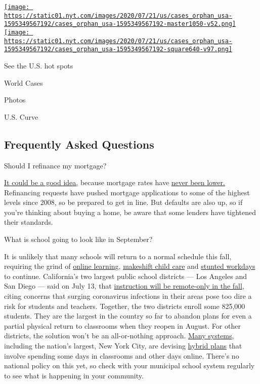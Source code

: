 \href{https://www.nytimes.com/interactive/2020/us/coronavirus-us-cases.html}{\texttt{[image: https://static01.nyt.com/images/2020/07/21/us/cases\_orphan\_usa-1595349567192/cases\_orphan\_usa-1595349567192-master1050-v52.png]}
\texttt{[image: https://static01.nyt.com/images/2020/07/21/us/cases\_orphan\_usa-1595349567192/cases\_orphan\_usa-1595349567192-square640-v97.png]}}

See the U.S. hot spots

World Cases

Photos

U.S. Curve

\hypertarget{frequently-asked-questions}{%
\subsection{Frequently Asked
Questions}\label{frequently-asked-questions}}

 Should I refinance my mortgage?

\href{https://www.nytimes.com/article/coronavirus-money-unemployment.html}{It
could be a good idea,} because mortgage rates have
\href{https://www.nytimes.com/2020/07/16/business/mortgage-rates-below-3-percent.html}{never
been lower.} Refinancing requests have pushed mortgage applications to
some of the highest levels since 2008, so be prepared to get in line.
But defaults are also up, so if you're thinking about buying a home, be
aware that some lenders have tightened their standards.

 What is school going to look like in September?

It is unlikely that many schools will return to a normal schedule this
fall, requiring the grind of
\href{https://www.nytimes.com/2020/06/05/us/coronavirus-education-lost-learning.html}{online
learning},
\href{https://www.nytimes.com/2020/05/29/us/coronavirus-child-care-centers.html}{makeshift
child care} and
\href{https://www.nytimes.com/2020/06/03/business/economy/coronavirus-working-women.html}{stunted
workdays} to continue. California's two largest public school districts
--- Los Angeles and San Diego --- said on July 13, that
\href{https://www.nytimes.com/2020/07/13/us/lausd-san-diego-school-reopening.html}{instruction
will be remote-only in the fall}, citing concerns that surging
coronavirus infections in their areas pose too dire a risk for students
and teachers. Together, the two districts enroll some 825,000 students.
They are the largest in the country so far to abandon plans for even a
partial physical return to classrooms when they reopen in August. For
other districts, the solution won't be an all-or-nothing approach.
\href{https://bioethics.jhu.edu/research-and-outreach/projects/eschool-initiative/school-policy-tracker/}{Many
systems}, including the nation's largest, New York City, are devising
\href{https://www.nytimes.com/2020/06/26/us/coronavirus-schools-reopen-fall.html}{hybrid
plans} that involve spending some days in classrooms and other days
online. There's no national policy on this yet, so check with your
municipal school system regularly to see what is happening in your
community.


